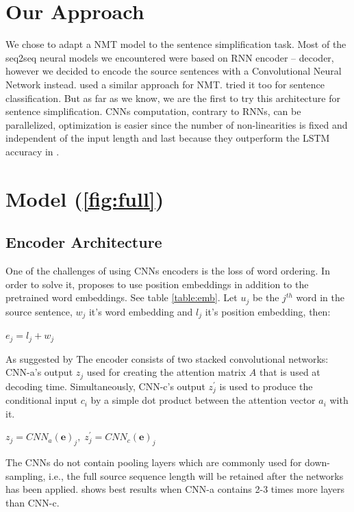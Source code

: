 \documentclass{article}
\begin{document}
\section{Our Approach}
We chose to adapt a NMT model to the sentence simplification task. Most of the seq2seq neural models we encountered were based on RNN encoder – decoder, however we decided to encode the source sentences with a Convolutional Neural Network instead.
\cite{DBLP:journals/corr/GehringAGD16} used a similar approach for NMT. \cite{di2019enriching} tried it too for sentence classification. But as far as we know, we are the first to try this architecture for sentence simplification.
CNNs computation, contrary to RNNs, can be parallelized, optimization is easier since the number of non-linearities is fixed and independent of the input length and last because they outperform the LSTM accuracy in \cite{DBLP:journals/corr/WuSCLNMKCGMKSJL16}. 

\section{Model (\ref{fig:full})}
\subsection{Encoder Architecture}
One of the challenges of using CNNs encoders is the loss of word ordering. In order to solve it, \cite{DBLP:journals/corr/GehringAGD16} proposes to use position embeddings in addition to the pretrained word embeddings. See table \ref{table:emb}. Let $u_j$ be the $j^{th}$ word in the source sentence, $w_j$ it's word embedding and $l_j$ it's position embedding, then:
\begin{center}
$e_j = l_j + w_j$
\end{center}
As suggested by \cite{DBLP:journals/corr/GehringAGD16} The encoder consists of two stacked convolutional networks: CNN-a’s output $z_{j}$ used for creating the attention matrix $A$ that is used at decoding time. Simultaneously, CNN-c’s output $z^{\prime}_{j}$ is used to produce the conditional input $c_i$ by a simple dot product between the attention vector $a_i$ with it.
\vspace{5mm}
\begin{center}
$z_j = CNN_a(\textbf{e})_j,\;z^{\prime}_{j} = CNN_c(\textbf{e})_j$
\vspace{5mm}
\end{center}

The CNNs do not contain pooling layers which are commonly used for down-sampling, i.e., the full source sequence length will be retained after the networks has been applied. \cite{DBLP:journals/corr/GehringAGD16} shows best results when CNN-a contains 2-3 times more layers than CNN-c.
\end{document}

